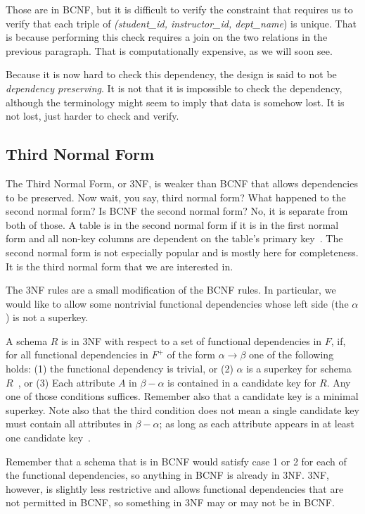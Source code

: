 Those are in BCNF, but it is difficult to verify the constraint that requires us to verify that each triple of \textit{(student\_id, instructor\_id, dept\_name}) is unique. That is because performing this check requires a join on the two relations in the previous paragraph. That is computationally expensive, as we will soon see. 

Because it is now hard to check this dependency, the design is said to not be \textit{dependency preserving}. It is not that it is impossible to check the dependency, although the terminology might seem to imply that data is somehow lost. It is not lost, just harder to check and verify.

\subsection*{Third Normal Form}
The Third Normal Form, or 3NF, is weaker than BCNF that allows dependencies to be preserved. Now wait, you say, third normal form? What happened to the second normal form? Is BCNF the second normal form? No, it is separate from both of those. A table is in the second normal form if it is in the first normal form and all non-key columns are dependent on the table's primary key~\cite{secnorm}. The second normal form is not especially popular and is mostly here for completeness. It is the third normal form that we are interested in. 
 
The 3NF rules are a small modification of the BCNF rules. In particular, we would like to allow some nontrivial functional dependencies whose left side (the $\alpha$) is not a superkey. 

A schema $R$ is in 3NF with respect to a set of functional dependencies in $F$, if, for all functional dependencies in $F^{+}$ of the form $\alpha \rightarrow \beta$ one of the following holds: (1) the functional dependency is trivial, or (2) $\alpha$ is a superkey for schema $R$~\cite{dsc}, or (3) Each attribute $A$ in $\beta - \alpha$ is contained in a candidate key for $R$. Any one of those conditions suffices. Remember also that a candidate key is a minimal superkey. Note also that the third condition does not mean a single candidate key must contain all attributes in $\beta - \alpha$; as long as each attribute appears in at least one candidate key~\cite{dsc}.

Remember that a schema that is in BCNF would satisfy case 1 or 2 for each of the functional dependencies, so anything in BCNF is already in 3NF. 3NF, however, is slightly less restrictive and allows functional dependencies that are not permitted in BCNF, so something in 3NF may or may not be in BCNF.

